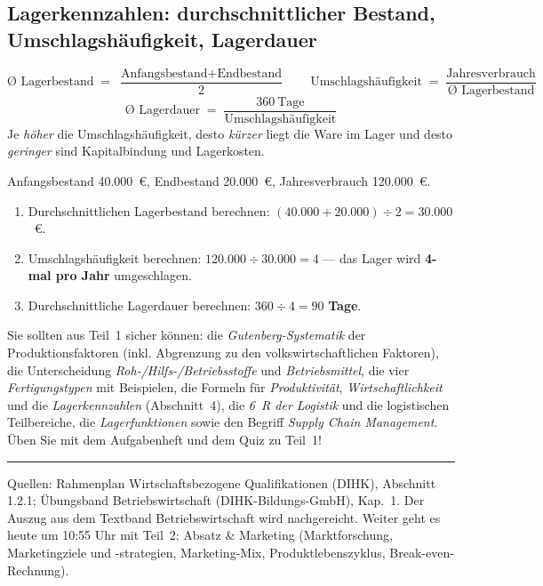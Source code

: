 \documentclass[11pt, a4paper]{article}
\begin{document}
\subsection{Lagerkennzahlen: durchschnittlicher Bestand, Umschlagshäufigkeit, Lagerdauer}

\begin{merksatz}[title={\bfseries Formeln: Lagerkennzahlen}]
\[
\text{Ø Lagerbestand} \;=\; \frac{\text{Anfangsbestand} + \text{Endbestand}}{2}
\qquad
\text{Umschlagshäufigkeit} \;=\; \frac{\text{Jahresverbrauch}}{\text{Ø Lagerbestand}}
\]
\[
\text{Ø Lagerdauer} \;=\; \frac{360\ \text{Tage}}{\text{Umschlagshäufigkeit}}
\]
Je \emph{höher} die Umschlagshäufigkeit, desto \emph{kürzer} liegt die Ware im Lager
und desto \emph{geringer} sind Kapitalbindung und Lagerkosten.
\end{merksatz}

\begin{beispiel}
Anfangsbestand 40.000~€, Endbestand 20.000~€, Jahresverbrauch 120.000~€.
\begin{enumerate}
  \item Durchschnittlichen Lagerbestand berechnen:
    $(40.000 + 20.000) \div 2 = 30.000$~€.
  \item Umschlagshäufigkeit berechnen: $120.000 \div 30.000 = 4$ ---
    das Lager wird \textbf{4-mal pro Jahr} umgeschlagen.
  \item Durchschnittliche Lagerdauer berechnen: $360 \div 4 = 90$ \textbf{Tage}.
\end{enumerate}
\end{beispiel}

\begin{merksatz}[title={\bfseries Wichtig für die Prüfungsvorbereitung}]
Sie sollten aus Teil~1 sicher können: die \emph{Gutenberg-Systematik} der
Produktionsfaktoren (inkl. Abgrenzung zu den volkswirtschaftlichen Faktoren), die
Unterscheidung \emph{Roh-/Hilfs-/Betriebsstoffe} und \emph{Betriebsmittel}, die vier
\emph{Fertigungstypen} mit Beispielen, die Formeln für \emph{Produktivität},
\emph{Wirtschaftlichkeit} und die \emph{Lagerkennzahlen} (Abschnitt~4), die
\emph{6~R der Logistik} und die logistischen Teilbereiche, die \emph{Lagerfunktionen}
sowie den Begriff \emph{Supply Chain Management}. Üben Sie mit dem Aufgabenheft und dem
Quiz zu Teil~1!
\end{merksatz}

\vspace{1em}
\hrule
\vspace{0.8em}
\noindent\textsf{\small Quellen: Rahmenplan Wirtschaftsbezogene Qualifikationen (DIHK), Abschnitt 1.2.1;
Übungsband Betriebswirtschaft (DIHK-Bildungs-GmbH), Kap.~1. Der Auszug aus dem Textband
Betriebswirtschaft wird nachgereicht. Weiter geht es heute um 10:55 Uhr mit Teil~2:
Absatz \& Marketing (Marktforschung, Marketingziele und -strategien, Marketing-Mix,
Produktlebenszyklus, Break-even-Rechnung).}
\end{document}

